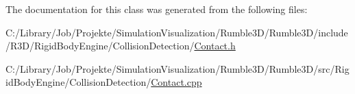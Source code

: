 The documentation for this class was generated from the following files\+:\begin{DoxyCompactItemize}
\item 
C\+:/\+Library/\+Job/\+Projekte/\+Simulation\+Visualization/\+Rumble3\+D/\+Rumble3\+D/include/\+R3\+D/\+Rigid\+Body\+Engine/\+Collision\+Detection/\mbox{\hyperlink{_contact_8h}{Contact.\+h}}\item 
C\+:/\+Library/\+Job/\+Projekte/\+Simulation\+Visualization/\+Rumble3\+D/\+Rumble3\+D/src/\+Rigid\+Body\+Engine/\+Collision\+Detection/\mbox{\hyperlink{_contact_8cpp}{Contact.\+cpp}}\end{DoxyCompactItemize}
